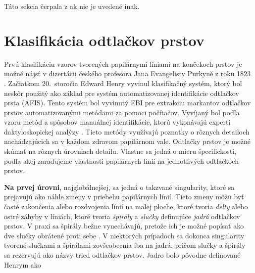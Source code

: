   Táto sekcia čerpala z \cite{Handbook} ak nie je uvedené inak.

  \section{Klasifikácia odtlačkov prstov} \label{sec:klasifikacia_odtl}
  Prvú klasifikáciu vzorov tvorených papilárnymi líniami na končekoch prstov je možné nájsť v dizertácii českého profesora Jana Evangelisty Purkyně
  z roku 1823 \cite{FingerprintSrcBook}. Začiatkom 20.~storočia Edward Henry vyvinul klasifikačný systém, ktorý bol neskôr použitý ako základ pre systém
  automatizovanej identifikácie odtlačkov prsta (AFIS). Tento systém bol vyvinutý FBI pre extrakciu markantov odtlačkov prstov automatizovanými metódami
  za pomoci počítačov. Vyvíjaný bol podľa vzoru metód a spôsobov manuálnej identifikácie, ktorú vykonávajú experti daktyloskopickej analýzy
  \cite{FingerprintSrcBook}. Tieto metódy využívajú poznatky o rôznych detailoch nachádzajúcich sa v každom zdravom papilárnom vale.
  Odtlačky prstov je možné skúmať na rôznych úrovniach detailu. Vlastne sa jedná o mieru špecifickosti, podľa akej zaraďujeme vlastnosti
  papilárnych línií na jednotlivých odtlačkoch prstov.

  \textbf{Na prvej úrovni}, najglobálnejšej, sa jedná o takzvané singularity, ktoré sa prejavujú ako náhle zmeny v priebehu papilárnych línií. Tieto 
  zmeny môžu byť časté zakončenia alebo rozdvojenia línií na malej ploche, ktoré tvoria \emph{delty} alebo ostré záhyby v líniách, 
  ktoré tvoria \emph{špirály} a \emph{slučky} definujúce \emph{jadrá} odtlačkov prstov. V praxi sa špirály bežne vynechávajú, pretože ich je možné popísať
  ako dve slučky obrátené proti sebe \cite{Handbook}. V niektorých prípadoch \cite{Drahansky, FingerprintSrcBook} sa dokonca singularity tvorené slučkami
  a špirálami zovšeobecnia iba na jadrá, pričom slučky a špirály sa rezervujú ako názvy tried odtlačkov prstov. Jadro bolo pôvodne definované Henrym \cite{Henry}
  ako 

